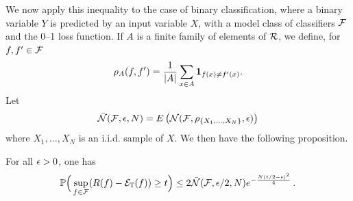 We now apply this inequality to  the case of  binary classification, where a binary variable $Y$ is predicted by an input variable $X$, with a model class of classifiers ${\mathcal F}$ and the 0--1 loss function. 
If $A$ is a finite family of elements of ${\mathcal R}$, we define, for $f, f'\in {\mathcal F}$ 
\[
\rho_A(f, f') = \frac1{|A|} \sum_{x\in A} {\bm 1}_{f(x)\neq f'(x)}.
\]
Let
\[
\bar {{\mathcal N}}({\mathcal F}, \epsilon, N) = E\left({\mathcal N}({\mathcal F}, \rho_{\{X_1, \ldots, X_N\}}, \epsilon)\right)
\]
where $X_1, \ldots, X_N$ is an i.i.d. sample of $X$. We then have the following proposition.
\begin{proposition}
\label{prop:entropy.first}
For all $\epsilon>0$, one has
\begin{equation}
\label{eq:chaining.intro}
\bm{\mathbb P}\Big(\sup_{f\in{\mathcal F}} (R(f) - {\mathcal E}_{\mathbb T}(f)) \geq t\Big) \leq 2 \bar {{\mathcal N}}({\mathcal F}, \epsilon/2, N) e^{-\frac{N(t/2-\epsilon)^2}{4}}\,.
\end{equation}
\end{proposition}
